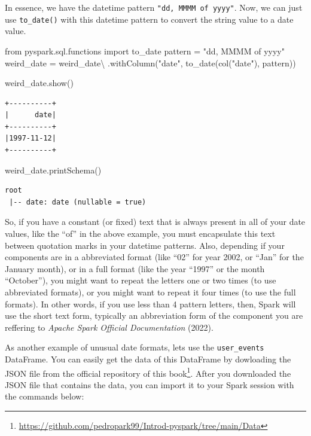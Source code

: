 \documentclass[
  11pt,
  letterpaper,
  DIV=11,
  numbers=noendperiod]{scrreprt}
\newenvironment{Shaded}{\begin{snugshade}}{\end{snugshade}}
\newcommand{\ImportTok}[1]{\textcolor[rgb]{0.00,0.46,0.62}{#1}}
\newcommand{\NormalTok}[1]{\textcolor[rgb]{0.00,0.23,0.31}{#1}}
\newcommand{\OperatorTok}[1]{\textcolor[rgb]{0.37,0.37,0.37}{#1}}
\newcommand{\StringTok}[1]{\textcolor[rgb]{0.13,0.47,0.30}{#1}}
\begin{document}
In essence, we have the datetime pattern
\texttt{"dd,\ MMMM\ \textquotesingle{}of\textquotesingle{}\ yyyy"}. Now,
we can just use \texttt{to\_date()} with this datetime pattern to
convert the string value to a date value.

\begin{Shaded}
\begin{Highlighting}[]
\ImportTok{from}\NormalTok{ pyspark.sql.functions }\ImportTok{import}\NormalTok{ to\_date}
\NormalTok{pattern }\OperatorTok{=} \StringTok{"dd, MMMM \textquotesingle{}of\textquotesingle{} yyyy"}
\NormalTok{weird\_date }\OperatorTok{=}\NormalTok{ weird\_date}\OperatorTok{\textbackslash{}}
\NormalTok{    .withColumn(}\StringTok{"date"}\NormalTok{, to\_date(col(}\StringTok{"date"}\NormalTok{), pattern))}

\NormalTok{weird\_date.show()}
\end{Highlighting}
\end{Shaded}

\begin{verbatim}
+----------+
|      date|
+----------+
|1997-11-12|
+----------+
\end{verbatim}

\begin{Shaded}
\begin{Highlighting}[]
\NormalTok{weird\_date.printSchema()}
\end{Highlighting}
\end{Shaded}

\begin{verbatim}
root
 |-- date: date (nullable = true)
\end{verbatim}

So, if you have a constant (or fixed) text that is always present in all
of your date values, like the ``of'' in the above example, you must
encapsulate this text between quotation marks in your datetime patterns.
Also, depending if your components are in a abbreviated format (like
``02'' for year 2002, or ``Jan'' for the January month), or in a full
format (like the year ``1997'' or the month ``October''), you might want
to repeat the letters one or two times (to use abbreviated formats), or
you might want to repeat it four times (to use the full formats). In
other words, if you use less than 4 pattern letters, then, Spark will
use the short text form, typically an abbreviation form of the component
you are reffering to \emph{Apache Spark Official Documentation} (2022).

As another example of unusual date formats, lets use the
\texttt{user\_events} DataFrame. You can easily get the data of this
DataFrame by dowloading the JSON file from the official repository of
this book\footnote{\url{https://github.com/pedropark99/Introd-pyspark/tree/main/Data}}.
After you downloaded the JSON file that contains the data, you can
import it to your Spark session with the commands below:
\end{document}
